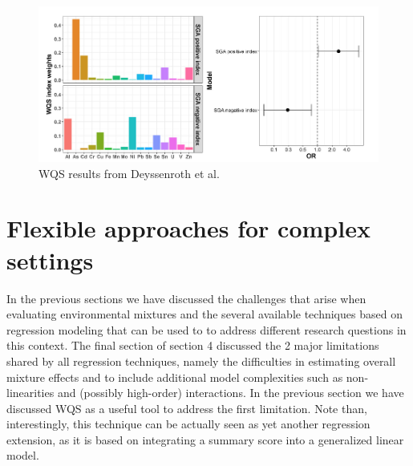 \documentclass[
]{book}
\begin{document}
\begin{figure}
\centering
\includegraphics{images/deys.png}
\caption{WQS results from Deyssenroth et al.}
\end{figure}

\hypertarget{flexible-approaches-for-complex-settings}{%
\chapter{Flexible approaches for complex settings}\label{flexible-approaches-for-complex-settings}}

In the previous sections we have discussed the challenges that arise when evaluating environmental mixtures and the several available techniques based on regression modeling that can be used to to address different research questions in this context. The final section of section 4 discussed the 2 major limitations shared by all regression techniques, namely the difficulties in estimating overall mixture effects and to include additional model complexities such as non-linearities and (possibly high-order) interactions. In the previous section we have discussed WQS as a useful tool to address the first limitation. Note than, interestingly, this technique can be actually seen as yet another regression extension, as it is based on integrating a summary score into a generalized linear model.
\end{document}
